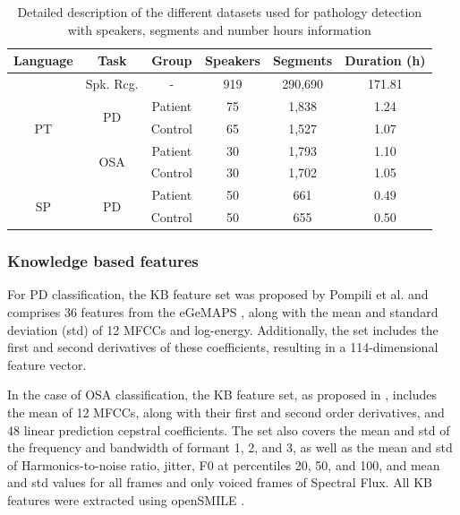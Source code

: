 \begin{table}[h]
  \centering
  \begin{tabular}{cccccc}
  \hline
  Language & Task & Group & Speakers & Segments & Duration (h) \\
    \hline
  \multirow{5}{*}{PT} & Spk. Rcg. & - & 919 & 290,690 & 171.81  \\ \cline{2-6}
  & \multirow{2}{*}{PD} & Patient & 75 & 1,838 & 1.24 \\
  & & Control & 65 & 1,527 & 1.07 \\ \cline{2-6}
  & \multirow{2}{*}{OSA} & Patient & 30 & 1,793 & 1.10 \\
  &  & Control & 30 & 1,702 & 1.05 \\
  \hline
  \multirow{2}{*}{SP} & \multirow{2}{*}{PD} & Patient & 50 & 661 & 0.49 \\
  & & Control & 50 & 655 & 0.50 \\

  \hline
  \end{tabular}
  \caption{Detailed description of the different datasets used for pathology detection with speakers, segments and number hours information}
  \label{tab:xvect_data}
  \end{table}
  

\subsubsection{Knowledge based features}
For \ac{PD} classification, the \ac{KB} feature set was proposed by Pompili et al. \cite{pompili2017automatic} and comprises 36 features from the eGeMAPS \cite{eyben2015geneva}, along with the mean and standard deviation (std) of 12 \acp{MFCC} and log-energy. Additionally, the set includes the first and second derivatives of these coefficients, resulting in a 114-dimensional feature vector.

In the case of \ac{OSA} classification, the \ac{KB} feature set, as proposed in \cite{botelho2019speech}, includes the mean of 12 \acp{MFCC}, along with their first and second order derivatives, and 48 linear prediction cepstral coefficients. The set also covers the mean and std of the frequency and bandwidth of formant 1, 2, and 3, as well as the mean and std of Harmonics-to-noise ratio, jitter, F0 at percentiles 20, 50, and 100, and mean and std values for all frames and only voiced frames of Spectral Flux. All \ac{KB} features were extracted using openSMILE \cite{eyben2013recent}.

